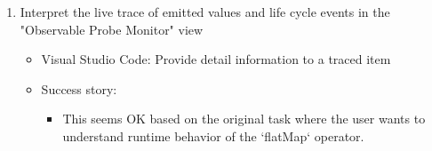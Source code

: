 \documentclass[sigplan,screen,nonacm,review]{acmart}
\begin{document}
\begin{enumerate}
	\item Interpret the live trace of emitted values and life cycle events in the "Observable Probe Monitor" view
	      \begin{itemize}
	      	\item Visual Studio Code: Provide detail information to a traced item
	      	\item Success story:
	      	      \begin{itemize}
	      	      	\item This seems OK based on the original task where the user wants to understand runtime behavior of the `flatMap` operator.
	      	      \end{itemize}
	      \end{itemize}
\end{enumerate}



\end{document}
